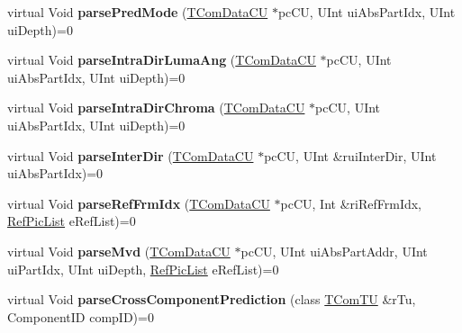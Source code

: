 \begin{DoxyCompactItemize}
virtual Void {\bfseries parse\+Pred\+Mode} (\hyperlink{class_t_com_data_c_u}{T\+Com\+Data\+CU} $\ast$pc\+CU, U\+Int ui\+Abs\+Part\+Idx, U\+Int ui\+Depth)=0
\item 
\mbox{\label{class_t_dec_entropy_if_aa16e13046e56907143f454b2089df45f}} 
virtual Void {\bfseries parse\+Intra\+Dir\+Luma\+Ang} (\hyperlink{class_t_com_data_c_u}{T\+Com\+Data\+CU} $\ast$pc\+CU, U\+Int ui\+Abs\+Part\+Idx, U\+Int ui\+Depth)=0
\item 
\mbox{\label{class_t_dec_entropy_if_a805d03fe9dfbb8b3edcd7781dafd2a7b}} 
virtual Void {\bfseries parse\+Intra\+Dir\+Chroma} (\hyperlink{class_t_com_data_c_u}{T\+Com\+Data\+CU} $\ast$pc\+CU, U\+Int ui\+Abs\+Part\+Idx, U\+Int ui\+Depth)=0
\item 
\mbox{\label{class_t_dec_entropy_if_a4f37c28aeff29b01384e7285c5d90b70}} 
virtual Void {\bfseries parse\+Inter\+Dir} (\hyperlink{class_t_com_data_c_u}{T\+Com\+Data\+CU} $\ast$pc\+CU, U\+Int \&rui\+Inter\+Dir, U\+Int ui\+Abs\+Part\+Idx)=0
\item 
\mbox{\label{class_t_dec_entropy_if_a1341614f7a31d31e729d5f4b74eea329}} 
virtual Void {\bfseries parse\+Ref\+Frm\+Idx} (\hyperlink{class_t_com_data_c_u}{T\+Com\+Data\+CU} $\ast$pc\+CU, Int \&ri\+Ref\+Frm\+Idx, \hyperlink{_type_def_8h_a93cea48eb9dcfd661168dee82e41b384}{Ref\+Pic\+List} e\+Ref\+List)=0
\item 
\mbox{\label{class_t_dec_entropy_if_a51e93f39970384dcf08de598e17fe960}} 
virtual Void {\bfseries parse\+Mvd} (\hyperlink{class_t_com_data_c_u}{T\+Com\+Data\+CU} $\ast$pc\+CU, U\+Int ui\+Abs\+Part\+Addr, U\+Int ui\+Part\+Idx, U\+Int ui\+Depth, \hyperlink{_type_def_8h_a93cea48eb9dcfd661168dee82e41b384}{Ref\+Pic\+List} e\+Ref\+List)=0
\item 
\mbox{\label{class_t_dec_entropy_if_a2413315ac87b814925c882f8f8d9062b}} 
virtual Void {\bfseries parse\+Cross\+Component\+Prediction} (class \hyperlink{class_t_com_t_u}{T\+Com\+TU} \&r\+Tu, Component\+ID comp\+ID)=0
\item 
\mbox{\label{class_t_dec_entropy_if_a2534a8030ef22d04344fe2c9b0d581df}} 

\end{DoxyCompactItemize}
